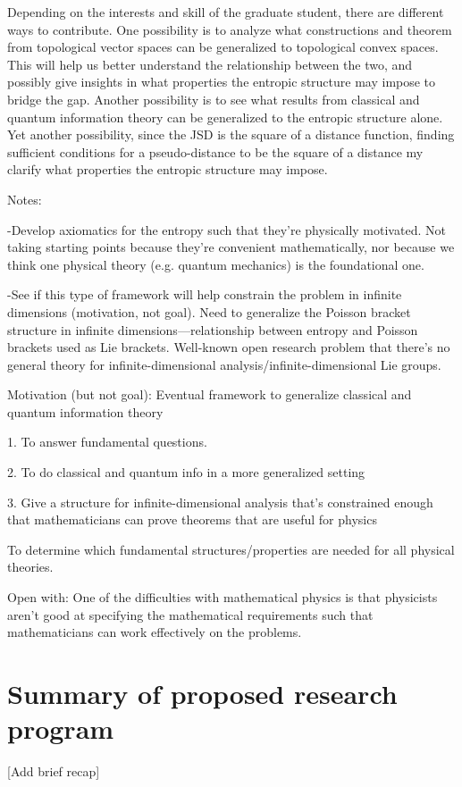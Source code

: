 Depending on the interests and skill of the graduate student, there are different ways to contribute. One possibility is to analyze what constructions and theorem from topological vector spaces can be generalized to topological convex spaces. This will help us better understand the relationship between the two, and possibly give insights in what properties the entropic structure may impose to bridge the gap. Another possibility is to see what results from classical and quantum information theory can be generalized to the entropic structure alone. Yet another possibility, since the JSD is the square of a distance function, finding sufficient conditions for a pseudo-distance to be the square of a distance my clarify what properties the entropic structure may impose. 


Notes:

-Develop axiomatics for the entropy such that they’re physically motivated.  Not taking starting points because they’re convenient mathematically, nor because we think one physical theory (e.g. quantum mechanics) is the foundational one.

-See if this type of framework will help constrain the problem in infinite dimensions (motivation, not goal).  Need to generalize the Poisson bracket structure in infinite dimensions—relationship between entropy and Poisson brackets used as Lie brackets.  Well-known open research problem that there’s no general theory for infinite-dimensional analysis/infinite-dimensional Lie groups.

Motivation (but not goal): Eventual framework to generalize classical and quantum information theory

1. To answer fundamental questions.

2. To do classical and quantum info in a more generalized setting

3. Give a structure for infinite-dimensional analysis that’s constrained enough that mathematicians can prove theorems that are useful for physics

To determine which fundamental structures/properties are needed for all physical theories.

Open with: One of the difficulties with mathematical physics is that physicists aren’t good at specifying the mathematical requirements such that mathematicians can work effectively on the problems.



\section{Summary of proposed research program}
[Add brief recap]

